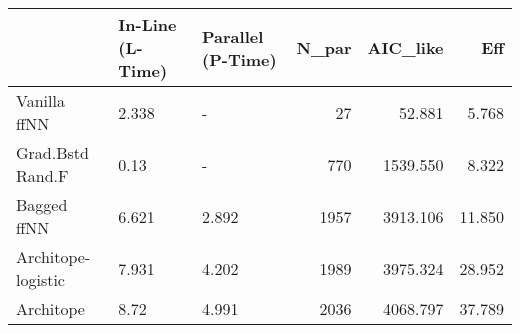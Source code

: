\begin{tabular}{lllrrr}
\toprule
{} & In-Line (L-Time) & Parallel (P-Time) &  N\_par &  AIC\_like &     Eff \\
\midrule
Vanilla ffNN       &            2.338 &                 - &     27 &    52.881 &   5.768 \\
Grad.Bstd Rand.F   &             0.13 &                 - &    770 &  1539.550 &   8.322 \\
Bagged ffNN        &            6.621 &             2.892 &   1957 &  3913.106 &  11.850 \\
Architope-logistic &            7.931 &             4.202 &   1989 &  3975.324 &  28.952 \\
Architope          &             8.72 &             4.991 &   2036 &  4068.797 &  37.789 \\
\bottomrule
\end{tabular}
